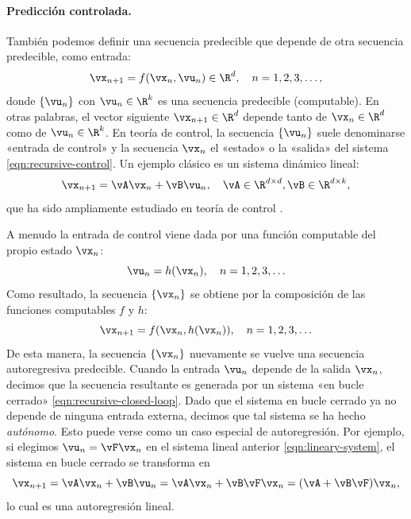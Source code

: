 \documentclass[../../book-main_es.tex]{subfiles}
\begin{document}
\paragraph{Predicción controlada.}
También podemos definir una secuencia predecible que depende de otra
secuencia predecible, como entrada:
\begin{equation}
    \vx_{n+1} = f(\vx_{n}, \vu_{n}) \in \R^{d}, \quad n = 1, 2, 3, \ldots,
    \label{eqn:recursive-control}
\end{equation}
donde \(\{\vu_{n}\}\) con \(\vu_{n} \in \R^{k}\) es una secuencia 
predecible (computable). En otras palabras, el vector siguiente
\(\vx_{n+1} \in \R^{d}\) depende tanto de \(\vx_{n} \in \R^{d}\) como de \(\vu_{n} \in
\R^{k}\). En teoría de control, la secuencia \(\{\vu_{n}\}\) suele denominarse 
«entrada de control» y la secuencia \(\vx_{n}\) el «estado» o la «salida» del sistema 
\eqref{eqn:recursive-control}. Un ejemplo clásico es un sistema dinámico lineal:
\begin{equation}
    \vx_{n+1} = \vA\vx_{n} + \vB\vu_{n}, \quad \vA \in \R^{d \times
    d}, \vB \in \R^{d \times k},
    \label{eqn:lineary-system}
\end{equation}
que ha sido ampliamente estudiado en teoría de control \cite{Cal:Des}.

A menudo la entrada de control viene dada por una función computable del propio
estado \(\vx_{n}\):
\begin{equation}
    \vu_{n} = h(\vx_{n}), \quad n = 1, 2, 3, \ldots
    \label{eqn:control-function}
\end{equation}
Como resultado, la secuencia \(\{\vx_{n}\}\) se obtiene por la composición de
las funciones computables \(f\) y \(h\):
\begin{equation}
    \vx_{n+1} = f(\vx_{n}, h(\vx_{n})), \quad n = 1, 2, 3, \ldots
    \label{eqn:recursive-closed-loop}
\end{equation}
De esta manera, la secuencia \(\{\vx_{n}\}\) nuevamente se vuelve una
secuencia autoregresiva predecible. Cuando la entrada \(\vu_{n}\)
depende de la salida \(\vx_{n}\), decimos que la secuencia resultante
es generada por un sistema «en bucle cerrado» \eqref{eqn:recursive-closed-loop}. 
Dado que el sistema en bucle cerrado ya no depende de ninguna entrada externa, 
decimos que tal sistema se ha hecho \textit{autónomo}. Esto puede verse
como un caso especial de autoregresión. Por ejemplo, si elegimos
\(\vu_{n} = \vF\vx_{n}\) en el sistema lineal anterior \eqref{eqn:lineary-system},
el sistema en bucle cerrado se transforma en
\begin{equation}
    \vx_{n+1} = \vA\vx_{n} + \vB\vu_{n} = \vA\vx_{n} + \vB\vF\vx_{n}
    = (\vA + \vB\vF)\vx_{n},
    \label{eqn:lineary-system-closed}
\end{equation}
lo cual es una autoregresión lineal.
\end{document}

